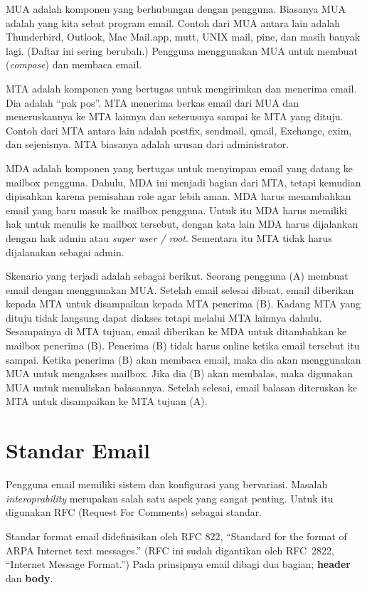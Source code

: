 MUA adalah komponen yang berhubungan dengan pengguna. Biasanya MUA adalah yang
kita sebut program email. Contoh dari MUA antara lain adalah Thunderbird,
Outlook, Mac Mail.app, mutt, UNIX mail, pine, dan masih banyak lagi. (Daftar
ini sering berubah.)
Pengguna menggunakan MUA untuk membuat ({\em compose}) dan membaca email.

MTA adalah komponen yang bertugas untuk mengirimkan dan menerima email. Dia
adalah ``pak pos''. MTA menerima berkas email dari MUA dan meneruskannya ke MTA
lainnya dan seterusnya sampai ke MTA yang dituju. Contoh dari MTA antara lain
adalah postfix, sendmail, qmail, Exchange, exim, dan sejenisnya. MTA biasanya
adalah urusan dari administrator.

MDA adalah komponen yang bertugas untuk menyimpan email yang datang ke mailbox
pengguna. Dahulu, MDA ini menjadi bagian dari MTA, tetapi kemudian dipisahkan
karena pemisahan role agar lebih aman. MDA harus menambahkan email yang baru
masuk ke mailbox pengguna. Untuk itu MDA harus memiliki hak untuk menulis ke
mailbox tersebut, dengan kata lain MDA harus dijalankan dengan hak admin atau
{\em super user / root}. Sementara itu MTA tidak harus dijalanakan sebagai admin.

Skenario yang terjadi adalah sebagai berikut. Seorang pengguna (A) membuat
email dengan menggunakan MUA. Setelah email selesai dibuat, email diberikan
kepada MTA untuk disampaikan kepada MTA penerima (B). Kadang MTA yang dituju
tidak langsung dapat diakses tetapi melalui MTA lainnya dahulu.  Sesampainya di
MTA tujuan, email diberikan ke MDA untuk ditambahkan ke mailbox penerima (B).
Penerima (B) tidak harus online ketika email tersebut itu sampai. Ketika
penerima (B) akan membaca email, maka dia akan menggunakan MUA untuk mengakses
mailbox. Jika dia (B) akan membalas, maka digunakan MUA untuk menuliskan
balasannya. Setelah selesai, email balasan diteruskan ke MTA untuk disampaikan
ke MTA tujuan (A).


\section{Standar Email}
Pengguna email memiliki sistem dan konfigurasi yang bervariasi. Masalah
{\em interoprability} merupakan salah satu aspek yang sangat penting. Untuk itu
digunakan RFC (Request For Comments) sebagai standar.

Standar format email didefinisikan oleh RFC 822, ``Standard for the format of 
ARPA Internet text messages.'' (RFC ini sudah digantikan oleh RFC~2822,
``Internet Message Format.'') Pada prinsipnya email dibagi dua bagian; {\bf
header} dan {\bf body}.

